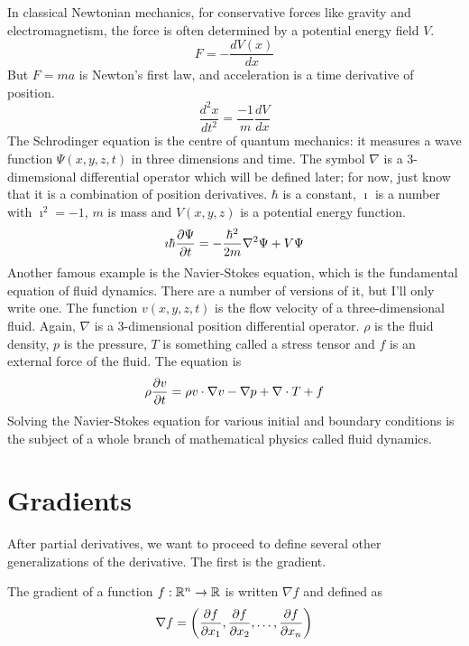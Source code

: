 \documentclass[fleqn,letterpaper]{report}
\begin{document}
In classical Newtonian mechanics, for conservative forces like
gravity and electromagnetism, the force is often determined by
a potential energy field $V$.
\begin{equation*}
F = - \frac{d V(x)}{dx}
\end{equation*}
But $F = ma$ is Newton's first law, and acceleration is a time
derivative of position. 
\begin{equation*}
\frac{d^2 x}{dt^2} = \frac{-1}{m} \frac{dV}{dx}
\end{equation*}
The Schrodinger equation is the centre of quantum mechanics:
it measures a wave function $\Psi(x,y,z,t)$ in three
dimensions and time. The symbol $\nabla$ is a 3-dimemsional
differential operator which will be defined later; for now,
just know that it is a combination of position derivatives.
$\hbar$ is a constant, $\imath$ is a number with $\imath^2 =
-1$, $m$ is mass and $V(x,y,z)$ is a potential energy
function. 
\begin{equation*}
\imath \hbar \frac{\partial \Psi}{\partial t} = - \frac{ \hbar^2}{2m}
\nabla^2 \Psi + V \Psi
\end{equation*}
Another famous example is the Navier-Stokes equation, which is
the fundamental equation of fluid dynamics. There are a
number of versions of it, but I'll only write one. The
function $v(x,y,z,t)$ is the flow velocity of a
three-dimensional fluid. Again, $\nabla$ is a 3-dimensional
position differential operator. $\rho$ is the fluid density,
$p$ is the pressure, $T$ is something called a stress tensor
and $f$ is an external force of the fluid. The equation is
\begin{equation*}
\rho \frac{\partial v}{\partial t} = \rho v \cdot \nabla v - \nabla p
+ \nabla \cdot T + f
\end{equation*}
Solving the Navier-Stokes equation for various initial and
boundary conditions is the subject of a whole branch of
mathematical physics called fluid dynamics. 

\section{Gradients}
\label{gradients}

After partial derivatives, we want to proceed to define
several other generalizations of the derivative. The first is
the gradient. 

\begin{defn}
The gradient of a function $f: \mathbb{R}^n \rightarrow \mathbb{R}$ is
written $\nabla f$ and defined as
\begin{equation*}
\nabla f = \left( \frac{\partial f}{\partial x_1}, \frac{\partial f}{\partial
x_2}, \ldots, \frac{\partial f}{\partial x_n} \right)
\end{equation*}
\end{defn}
\end{document}

